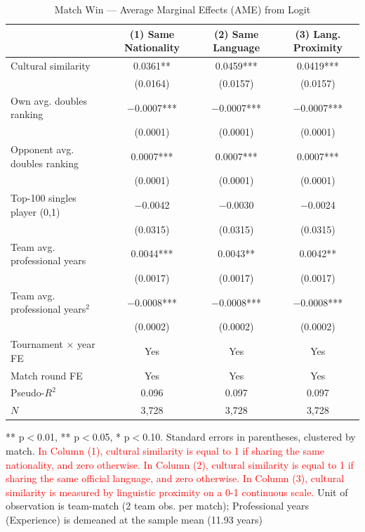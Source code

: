 \documentclass[10pt]{article}
\begin{document}
\begin{table}[htbp]
\color{blue}
\centering
\caption{Match Win — Average Marginal Effects (AME) from Logit \label{tab:t3}}
\begin{threeparttable}
\begin{tabular}{lccc}
\toprule
 & (1) Same Nationality & (2) Same Language & (3) Lang. Proximity \\
\midrule
Cultural similarity & 0.0361** & 0.0459*** & 0.0419*** \\
 & (0.0164) & (0.0157) & (0.0157) \\
Own avg. doubles ranking & $-$0.0007*** & $-$0.0007*** & $-$0.0007*** \\
 & (0.0001) & (0.0001) & (0.0001) \\
Opponent avg. doubles ranking & 0.0007*** & 0.0007*** & 0.0007*** \\
 & (0.0001) & (0.0001) & (0.0001) \\
Top-100 singles player (0,1)& $-$0.0042 & $-$0.0030 & $-$0.0024 \\
 & (0.0315) & (0.0315) & (0.0315) \\
Team avg. professional years  & 0.0044*** & 0.0043** & 0.0042** \\
 & (0.0017) & (0.0017) & (0.0017) \\
Team avg. professional years$^2$  & $-$0.0008*** & $-$0.0008*** & $-$0.0008*** \\
 & (0.0002) & (0.0002) & (0.0002) \\
\midrule
Tournament $\times$ year FE & Yes & Yes & Yes \\
Match round FE & Yes & Yes & Yes \\
Pseudo-$R^2$ & 0.096 & 0.097 & 0.097 \\
$N$ & 3,728 & 3,728 & 3,728 \\
\bottomrule
\end{tabular}
\begin{tablenotes}
\small
\item *** p$<$0.01, ** p$<$0.05, * p$<$0.10. Standard errors in parentheses, clustered by match. \textcolor{red}{In Column (1), cultural similarity is equal to 1 if sharing the same nationality, and zero otherwise. In Column (2), cultural similarity is equal to 1 if sharing the same official language, and zero otherwise. In Column (3), cultural similarity is measured by linguistic proximity on a 0-1 continuous scale.} Unit of observation is team-match (2 team obs. per match); Professional years (Experience) is demeaned at the sample mean (11.93 years)
\end{tablenotes}
\end{threeparttable}
\end{table}
\FloatBarrier
\end{document}

